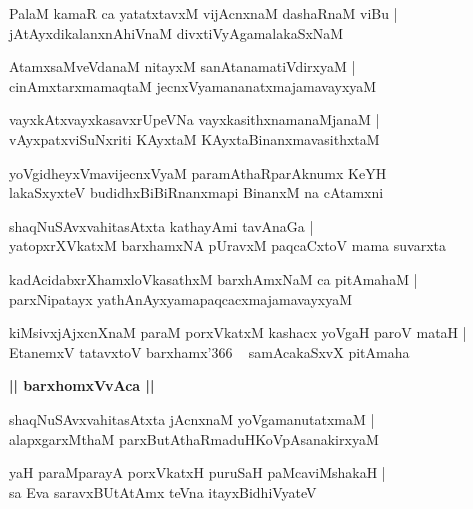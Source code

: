 \documentclass[twoside,12pt,openright]{book}
\newcounter{shloka}[chapter]
\def\uvaca#1{\centerline{{\large\textbf{#1}}}}
\begin{document}
\begin{shloka}%
PalaM kamaR ca yatatxtavxM vijAcnxnaM dashaRnaM viBu |\\
jAtAyxdikalanxnAhiVnaM divxtiVyAgamalakaSxNaM 
\end{shloka}

\begin{shloka}%
AtamxsaMveVdanaM nitayxM sanAtanamatiVdirxyaM |\\
cinAmxtarxmamaqtaM jecnxVyamananatxmajamavayxyaM 
\end{shloka}

\begin{shloka}%
vayxkAtxvayxkasavxrUpeVNa vayxkasithxnamanaMjanaM |\\
vAyxpatxviSuNxriti KAyxtaM KAyxtaBinanxmavasithxtaM 
\end{shloka}

\begin{shloka}%
yoVgidheyxVmavijecnxVyaM paramAthaRparAknumx KeYH \\
lakaSxyxteV budidhxBiBiRnanxmapi BinanxM na cAtamxni
\end{shloka}

\begin{shloka}%
shaqNuSAvxvahitasAtxta kathayAmi tavAnaGa |\\
yatopxrXVkatxM barxhamxNA pUravxM paqcaCxtoV mama suvarxta
\end{shloka}

\begin{shloka}%
kadAcidabxrXhamxloVkasathxM barxhAmxNaM ca pitAmahaM |\\
parxNipatayx yathAnAyxyamapaqcacxmajamavayxyaM 
\end{shloka}

\begin{shloka}%
kiMsivxjAjxcnXnaM paraM porxVkatxM kashacx yoVgaH paroV mataH |\\
EtanemxV tatavxtoV barxhamx\char'366 ~ samAcakaSxvX pitAmaha
\end{shloka}

\uvaca{|| barxhomxVvAca ||}

\begin{shloka}%
shaqNuSAvxvahitasAtxta jAcnxnaM yoVgamanutatxmaM |\\
alapxgarxMthaM parxButAthaRmaduHKoVpAsanakirxyaM 
\end{shloka}

\begin{shloka}%
yaH paraMparayA porxVkatxH puruSaH paMcaviMshakaH |\\
sa Eva saravxBUtAtAmx teVna itayxBidhiVyateV 
\end{shloka}
\end{document}
